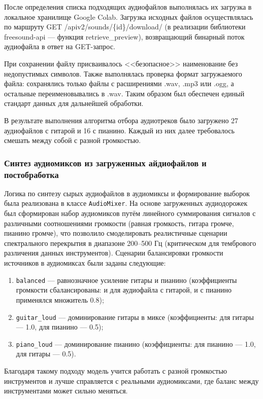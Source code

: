 \documentclass[14pt]{extarticle}
\begin{document}
После определения списка подходящих аудиофайлов выполнялась их загрузка в локальное хранилище Google Colab.
Загрузка исходных файлов осуществлялась по маршруту GET /apiv2/sounds/\{id\}/download/ (в реализации библиотеки freesound-api --- функция retrieve\_preview), 
возвращающий бинарный поток аудиофайла в ответ на GET-запрос.

При сохранении файлу присваивалось <<безопасное>> наименование без недопустимых символов.
Также выполнялась проверка формат загружаемого файла: сохранялись только файлы с расширениями .wav, .mp3 или .ogg, а остальные переименовывались в .wav. 
Таким образом был обеспечен единый стандарт данных для дальнейшей обработки.

В результате выполнения алгоритма отбора аудиотреков было загружено 27 аудиофайлов 
с гитарой и 16 с пианино. Каждый из них далее требовалось смешать между собой с разной громкостью.

\subsubsection{Синтез аудиомиксов из загруженных айдиофайлов и постобработка}

Логика по синтезу сырых аудиофайлов в аудиомиксы и формирование выборок была реализована в классе \texttt{AudioMixer}.
На основе загруженных аудиодорожек был сформирован набор аудиомиксов путём линейного 
суммирования сигналов с различными соотношениями громкости (равная громкость, гитара громче, пианино громче),
что позволило смоделировать реалистичные сценарии спектрального перекрытия в диапазоне 200–500 Гц (критическом для тембрового различения данных инструментов).
Сценарии балансировки громкости источников в аудиомиксах были заданы следующие:
\begin{enumerate}[label=\arabic*)]
	\item \texttt{balanced} --- равнозначное усиление гитары и пианино (коэффициенты громкости сбалансированы: и для аудиофайла с гитарой, и с пианино применялся множитель 0.8);
	\item \texttt{guitar\_loud} --- доминирование гитары в миксе (коэффициенты: для гитары --- 1.0, для пианино --- 0.5);
	\item \texttt{piano\_loud} — доминирование пианино (коэффициенты: для пианино --- 1.0, для гитары --- 0.5).
\end{enumerate}
Благодаря такому подходу модель учится работать с разной громкостью инструментов и лучше справляется с реальными 
аудиомиксами, где баланс между инструментами может сильно меняться.
\end{document}

